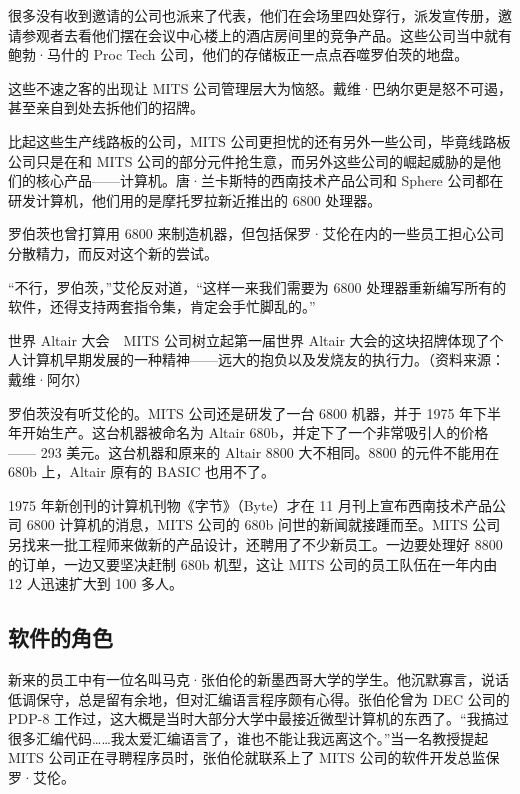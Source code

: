 \documentclass[12pt,UTF8]{ctexbook}
\begin{document}
很多没有收到邀请的公司也派来了代表，他们在会场里四处穿行，派发宣传册，邀请参观者去看他们摆在会议中心楼上的酒店房间里的竞争产品。这些公司当中就有鲍勃·马什的 Proc Tech 公司，他们的存储板正一点点吞噬罗伯茨的地盘。

这些不速之客的出现让 MITS 公司管理层大为恼怒。戴维·巴纳尔更是怒不可遏，甚至亲自到处去拆他们的招牌。

比起这些生产线路板的公司，MITS 公司更担忧的还有另外一些公司，毕竟线路板公司只是在和 MITS 公司的部分元件抢生意，而另外这些公司的崛起威胁的是他们的核心产品——计算机。唐·兰卡斯特的西南技术产品公司和 Sphere 公司都在研发计算机，他们用的是摩托罗拉新近推出的 6800 处理器。

罗伯茨也曾打算用 6800 来制造机器，但包括保罗·艾伦在内的一些员工担心公司分散精力，而反对这个新的尝试。

“不行，罗伯茨，”艾伦反对道，“这样一来我们需要为 6800 处理器重新编写所有的软件，还得支持两套指令集，肯定会手忙脚乱的。”



世界 Altair 大会　MITS 公司树立起第一届世界 Altair 大会的这块招牌体现了个人计算机早期发展的一种精神——远大的抱负以及发烧友的执行力。（资料来源：戴维·阿尔）

罗伯茨没有听艾伦的。MITS 公司还是研发了一台 6800 机器，并于 1975 年下半年开始生产。这台机器被命名为 Altair 680b，并定下了一个非常吸引人的价格—— 293 美元。这台机器和原来的 Altair 8800 大不相同。8800 的元件不能用在 680b 上，Altair 原有的 BASIC 也用不了。

1975 年新创刊的计算机刊物《字节》（Byte）才在 11 月刊上宣布西南技术产品公司 6800 计算机的消息，MITS 公司的 680b 问世的新闻就接踵而至。MITS 公司另找来一批工程师来做新的产品设计，还聘用了不少新员工。一边要处理好 8800 的订单，一边又要坚决赶制 680b 机型，这让 MITS 公司的员工队伍在一年内由 12 人迅速扩大到 100 多人。





\subsection{软件的角色}


新来的员工中有一位名叫马克·张伯伦的新墨西哥大学的学生。他沉默寡言，说话低调保守，总是留有余地，但对汇编语言程序颇有心得。张伯伦曾为 DEC 公司的 PDP-8 工作过，这大概是当时大部分大学中最接近微型计算机的东西了。“我搞过很多汇编代码……我太爱汇编语言了，谁也不能让我远离这个。”当一名教授提起 MITS 公司正在寻聘程序员时，张伯伦就联系上了 MITS 公司的软件开发总监保罗·艾伦。
\end{document}
